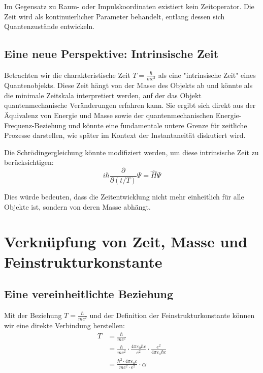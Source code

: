 \documentclass{article}
\begin{document}
	Im Gegensatz zu Raum- oder Impulskoordinaten existiert kein Zeitoperator. Die Zeit wird als kontinuierlicher Parameter behandelt, entlang dessen sich Quantenzustände entwickeln.
	
	\subsection{Eine neue Perspektive: Intrinsische Zeit}
	
	Betrachten wir die charakteristische Zeit $T = \frac{\hbar}{mc^2}$ als eine "intrinsische Zeit" eines Quantenobjekts. Diese Zeit hängt von der Masse des Objekts ab und könnte als die minimale Zeitskala interpretiert werden, auf der das Objekt quantenmechanische Veränderungen erfahren kann. Sie ergibt sich direkt aus der Äquivalenz von Energie und Masse sowie der quantenmechanischen Energie-Frequenz-Beziehung und könnte eine fundamentale untere Grenze für zeitliche Prozesse darstellen, wie später im Kontext der Instantaneität diskutiert wird.
	
	Die Schrödingergleichung könnte modifiziert werden, um diese intrinsische Zeit zu berücksichtigen:
	\begin{equation}
		i\hbar \frac{\partial}{\partial (t/T)}\Psi = \hat{H}\Psi
	\end{equation}
	
	Dies würde bedeuten, dass die Zeitentwicklung nicht mehr einheitlich für alle Objekte ist, sondern von deren Masse abhängt.
	
	\section{Verknüpfung von Zeit, Masse und Feinstrukturkonstante}
	
	\subsection{Eine vereinheitlichte Beziehung}
	
	Mit der Beziehung $T = \frac{\hbar}{mc^2}$ und der Definition der Feinstrukturkonstante können wir eine direkte Verbindung herstellen:
	\begin{align}
		T &= \frac{\hbar}{mc^2} \\
		&= \frac{\hbar}{mc^2} \cdot \frac{4\pi\varepsilon_0\hbar c}{e^2} \cdot \frac{e^2}{4\pi\varepsilon_0\hbar c} \\
		&= \frac{\hbar^2 \cdot 4\pi\varepsilon_0 c}{mc^2 \cdot e^2} \cdot \alpha
	\end{align}
	
\end{document}
